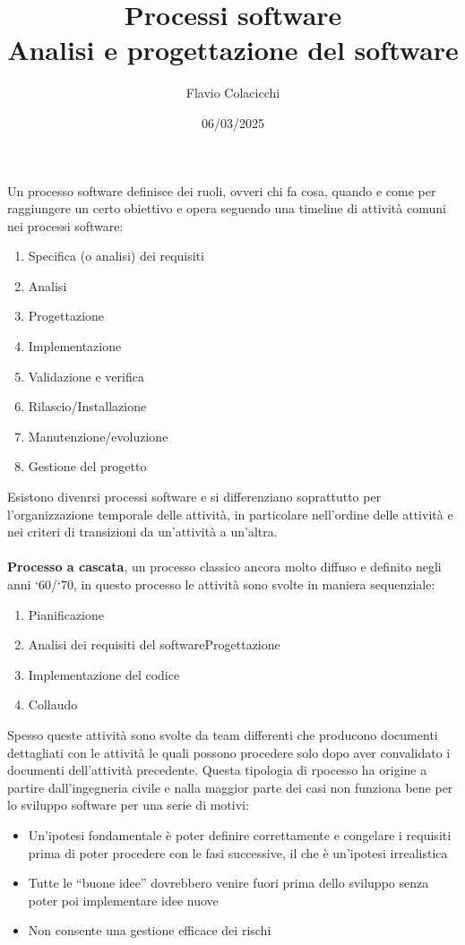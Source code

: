 \documentclass{article}
\title{Processi software\\\normalsize Analisi e progettazione del software}
\author{Flavio Colacicchi}
\date{06/03/2025}
\newcommand{\acapo}{\\\hspace*{1cm}\\}
\newcommand{\vopen}{``}
\newcommand{\apexopen}{`}
\newcommand{\vclosespace}{'' }
\begin{document}
\maketitle
Un processo software definisce dei ruoli, ovveri chi fa cosa, quando e come per raggiungere un certo obiettivo e opera seguendo una timeline di attività comuni nei processi software:
\begin{enumerate}
    \item Specifica (o analisi) dei requisiti
    \item Analisi
    \item Progettazione
    \item Implementazione
    \item Validazione e verifica
    \item Rilascio/Installazione
    \item Manutenzione/evoluzione
    \item Gestione del progetto
\end{enumerate}
Esistono divenrsi processi software e si differenziano soprattutto per l'organizzazione temporale delle attività, in particolare nell'ordine delle attività e nei criteri di transizioni da un'attività a un'altra.\acapo
\textbf{Processo a cascata}, un processo classico ancora molto diffuso e definito negli anni \apexopen60/\apexopen70, in questo processo le attività sono svolte in maniera sequenziale:
\begin{enumerate}
    \item Pianificazione
    \item Analisi dei requisiti del softwareProgettazione
    \item Implementazione del codice
    \item Collaudo
\end{enumerate}
Spesso queste attività sono svolte da team differenti che producono documenti dettagliati con le attività le quali possono procedere solo dopo aver convalidato i documenti dell'attività precedente. Questa tipologia di rpocesso ha origine a partire dall'ingegneria civile e nalla maggior parte dei casi non funziona bene per lo sviluppo software per una serie di motivi:
\begin{itemize}
  \item Un'ipotesi fondamentale è poter definire correttamente e congelare i requisiti prima di poter procedere con le fasi successive, il che è un'ipotesi irrealistica
  \item Tutte le \vopen buone idee\vclosespace dovrebbero venire fuori prima dello sviluppo senza poter poi implementare idee nuove
  \item Non consente una gestione efficace dei rischi
\end{itemize}
\end{document}
